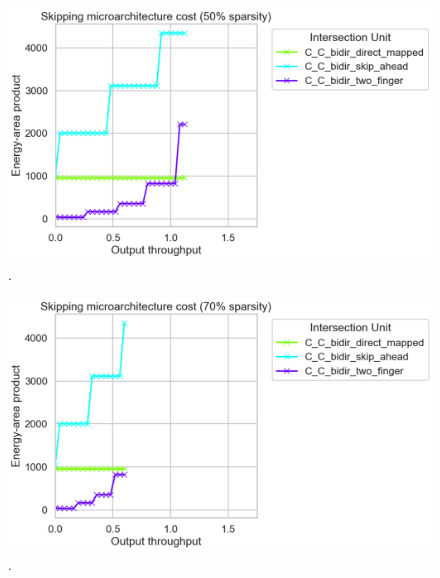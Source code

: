 \begin{figure}[H]
\includegraphics[width=\textwidth]{figures/skip_uarch_sparsity_50pct.png}
\caption{.}
\label{fig:skip_uarch_sparsity_50pct}
\end{figure}

\begin{figure}[H]
\includegraphics[width=\textwidth]{figures/skip_uarch_sparsity_70pct.png}
\caption{.}
\label{fig:skip_uarch_sparsity_70pct}
\end{figure}